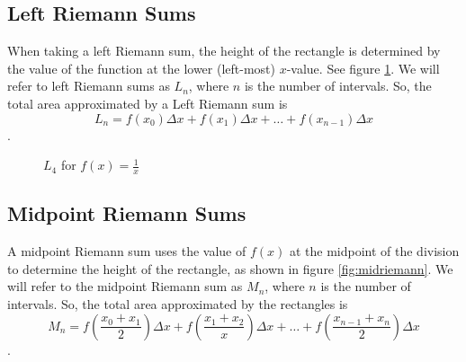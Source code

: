 \subsection{Left Riemann Sums}
When taking a left Riemann sum, the height of the rectangle is determined by the value of the function at the lower (left-most) $x$-value. See figure \ref{fig:leftriemann}. We will refer to left Riemann sums as $L_n$, where $n$ is the number of intervals. So, the total area approximated by a Left Riemann sum is $$L_n = f(x_0)\Delta x + f(x_1)\Delta x + \ldots + f(x_{n-1})\Delta x$$.

\begin{figure}
    \centering
    \caption{$L_4$ for $f(x)=\frac{1}{x}$}
    \label{fig:leftriemann}
\end{figure}


\subsection{Midpoint Riemann Sums}
A midpoint Riemann sum uses the value of $f(x)$ at the midpoint of the division to determine the height of the rectangle, as shown in figure \ref{fig:midriemann}. We will refer to the midpoint Riemann sum as $M_n$, where $n$ is the number of intervals. So, the total area approximated by the rectangles is $$M_n = f(\frac{x_0+x_1}{2})\Delta x + f(\frac{x_1+x_2}{x})\Delta x + \ldots + f(\frac{x_{n-1}+x_n}{2})\Delta x$$.

